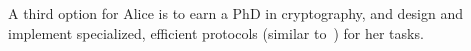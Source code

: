 A third option for Alice is to earn a PhD in cryptography, and design
and implement specialized, efficient \mpc protocols (similar
to~\cite{shafindss,wu,minionn}) for her tasks.










